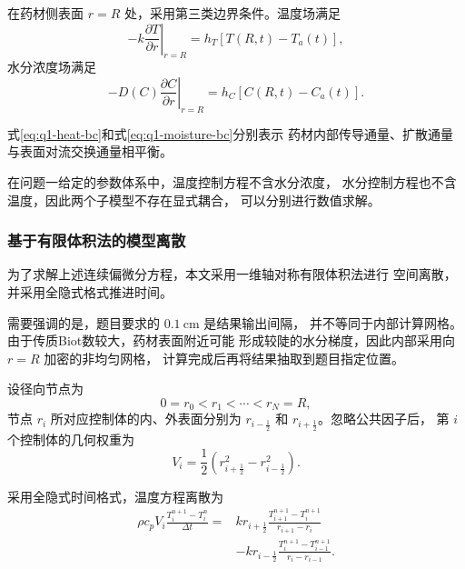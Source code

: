 \documentclass[12pt,a4paper]{article}
\begin{document}
在药材侧表面 $r=R$ 处，采用第三类边界条件。温度场满足
\begin{equation}
\boxed{
-k\left.\frac{\partial T}{\partial r}\right|_{r=R}
=
h_T\left[T(R,t)-T_a(t)\right]
},
\label{eq:q1-heat-bc}
\end{equation}
水分浓度场满足
\begin{equation}
\boxed{
-D(C)\left.\frac{\partial C}{\partial r}\right|_{r=R}
=
h_C\left[C(R,t)-C_a(t)\right]
}.
\label{eq:q1-moisture-bc}
\end{equation}

式\eqref{eq:q1-heat-bc}和式\eqref{eq:q1-moisture-bc}分别表示
药材内部传导通量、扩散通量与表面对流交换通量相平衡。

在问题一给定的参数体系中，温度控制方程不含水分浓度，
水分控制方程也不含温度，因此两个子模型不存在显式耦合，
可以分别进行数值求解。

\subsubsection{基于有限体积法的模型离散}

为了求解上述连续偏微分方程，本文采用一维轴对称有限体积法进行
空间离散，并采用全隐式格式推进时间。

需要强调的是，题目要求的 $0.1\ \mathrm{cm}$ 是结果输出间隔，
并不等同于内部计算网格。由于传质Biot数较大，药材表面附近可能
形成较陡的水分梯度，因此内部采用向 $r=R$ 加密的非均匀网格，
计算完成后再将结果抽取到题目指定位置。

设径向节点为
\begin{equation}
0=r_0<r_1<\cdots<r_N=R,
\end{equation}
节点 $r_i$ 所对应控制体的内、外表面分别为
$r_{i-\frac12}$ 和 $r_{i+\frac12}$。忽略公共因子后，
第 $i$ 个控制体的几何权重为
\begin{equation}
V_i=
\frac{1}{2}
\left(
r_{i+\frac12}^{2}-r_{i-\frac12}^{2}
\right).
\label{eq:q1-volume}
\end{equation}

采用全隐式时间格式，温度方程离散为
\begin{equation}
\begin{aligned}
\rho c_pV_i
\frac{T_i^{n+1}-T_i^n}{\Delta t}
={}&
kr_{i+\frac12}
\frac{T_{i+1}^{n+1}-T_i^{n+1}}
{r_{i+1}-r_i}\\
&-
kr_{i-\frac12}
\frac{T_i^{n+1}-T_{i-1}^{n+1}}
{r_i-r_{i-1}}.
\end{aligned}
\label{eq:q1-heat-fvm}
\end{equation}
\end{document}
